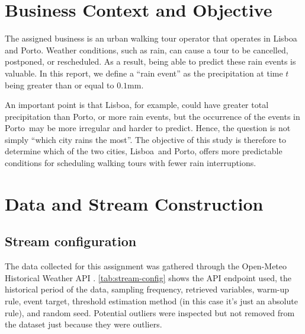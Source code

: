 \documentclass[11pt,a4paper]{article}
\newcommand{\CityA}{Lisboa}
\newcommand{\CityB}{Porto}
\newif\ifdraftinstructions
\newcommand{\instruction}[1]{%
	\ifdraftinstructions
	\begin{instructionbox}[title=What to write here]
		\small\color{SecondaryText}#1
	\end{instructionbox}
	\fi
}
\newcommand{\draftbanner}{%
	\ifdraftinstructions
	\begin{warningbox}[title=Template mode is ON]
		\small This PDF still displays writing guidance. Before final submission, change
		\texttt{\string\draftinstructionstrue} to
		\texttt{\string\draftinstructionsfalse} near the top of \texttt{main.tex} and compile again.
	\end{warningbox}
	\fi
}
\begin{document}
	\draftbanner

	\section{Business Context and Objective}
	\instruction{Briefly describe the assigned business problem and the operational decision to be supported. Identify the two cities and the event target. Explain why this event matters to the business. End the section with one concise objective or guiding question. Do not make the recommendation yet. Suggested length: about half a page.}
	
	The assigned business is an urban walking tour operator that operates in Lisboa and Porto. Weather conditions, such as rain, can cause a tour to be cancelled, postponed, or rescheduled. As a result, being able to predict these rain events is valuable. In this report, we define a ``rain event'' as the precipitation at time $t$ being greater than or equal to $0.1\mathrm{mm}$.
	
	An important point is that \CityA, for example, could have greater total precipitation than \CityB, or more rain events, but the occurrence of the events in \CityB\ may be more irregular and harder to predict. Hence, the question is not simply ``which city rains the most''. The objective of this study is therefore to determine which of the two cities, \CityA\ and \CityB, offers more predictable conditions for scheduling walking tours with fewer rain interruptions.
	
	\section{Data and Stream Construction}
	\instruction{Describe the Open-Meteo data source, historical period, weather variables, sampling frequency, chronological ordering, warm-up, preprocessing, target construction, and any cleaning decisions. Explain how potential outliers were inspected. Remember: valid extreme weather observations are not automatically errors. State explicitly that future information was not used to construct current inputs. Suggested length: half to one page.}
	
	\subsection{Stream configuration}
	The data collected for this assignment was gathered through the Open-Meteo Historical Weather API \parencite{openmeteo}. \autoref{tab:stream-config} shows the API endpoint used, the historical period of the data, sampling frequency, retrieved variables, warm-up rule, event target, threshold estimation method (in this case it's just an absolute rule), and random seed. Potential outliers were inspected but not removed from the dataset just because they were outliers.
	
\end{document}
